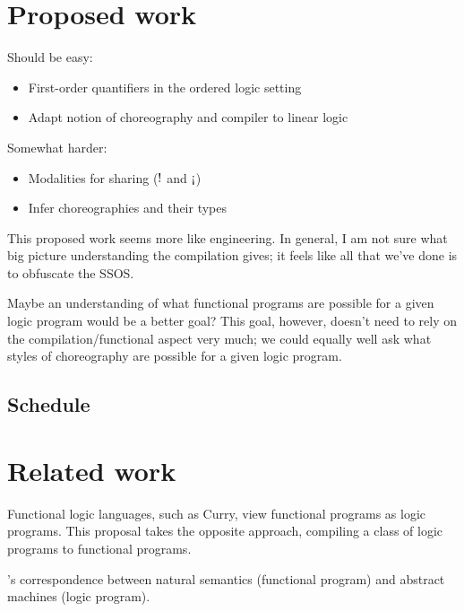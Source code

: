 \documentclass{article}
\begin{document}
\section{Proposed work}\label{sec:extensions}

Should be easy:
\begin{itemize}
\item First-order quantifiers in the ordered logic setting
\item Adapt notion of choreography and compiler to linear logic
\end{itemize}
Somewhat harder:
\begin{itemize}
\item Modalities for sharing ($\mathord{!}$ and $\mathord{\text{!`}}$)
\item Infer choreographies and their types
\end{itemize}

This proposed work seems more like engineering.
In general, I am not sure what big picture understanding the compilation gives; it feels like all that we've done is to obfuscate the SSOS.

Maybe an understanding of what functional programs are possible for a given logic program would be a better goal?
This goal, however, doesn't need to rely on the compilation/functional aspect very much;
we could equally well ask what styles of choreography are possible for a given logic program.


\subsection{Schedule}\label{sec:schedule}

\section{Related work}\label{sec:related-work}

Functional logic languages, such as Curry\cite{Hanus:Ganzinger13}, view functional programs as logic programs.
This proposal takes the opposite approach, compiling a class of logic programs to functional programs.

\citeauthor{Simmons-Zerny:LICS13}'s correspondence between natural semantics (functional program) and abstract machines (logic program)\autocite{Simmons-Zerny:LICS13}.

% 
% 
\printbibliography
\end{document}
